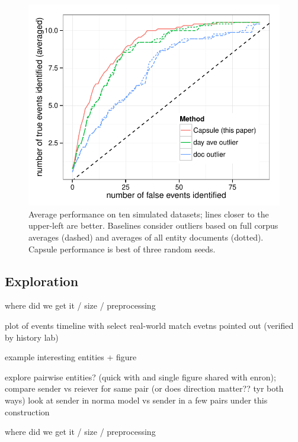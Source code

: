 \begin{figure}[ht]
\centering
\includegraphics[width=\linewidth]{fig/sim_auc.pdf}
\caption{Average performance on ten simulated datasets; lines closer to the upper-left are better.  Baselines consider outliers based on full corpus averages (dashed) and averages of all entity documents (dotted).  Capsule performance is best of three random seeds.}
\label{fig:sim_auc}
\end{figure}




\subsection{Exploration}

\PP where did we get it / size / preprocessing

\PP plot of events timeline with select real-world match evetns pointed out (verified by history lab)

\PP example interesting entities + figure

\PP explore pairwise entities? (quick with and single figure shared with enron); compare sender vs reiever for same pair  (or does direction matter?? tyr both ways) look at sender in norma model vs sender in a few pairs under this construction 

\PP where did we get it / size / preprocessing

